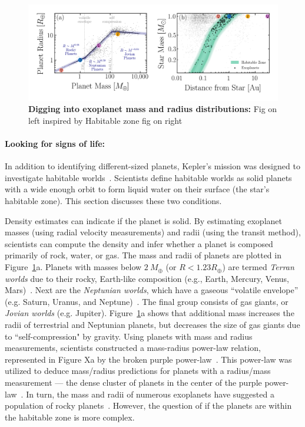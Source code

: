 \begin{figure}
\begin{center}
  \centerline{\includegraphics[width=1.1\linewidth]{src/figures/radii_and_mass_relations.png}}
  \caption{\textbf{Digging into exoplanet mass and radius distributions:} 
  Fig on left inspired by \cite{Chen:2017:ApJ}
  Habitable zone fig on right 
  }
  \label{fig:exo_mass_radius_relations}
\end{center}
\end{figure}



\paragraph{Looking for signs of life:}
In addition to identifying different-sized planets, Kepler's mission was designed to investigate habitable worlds~\cite{kepler_mission}.
Scientists define habitable worlds as solid planets with a wide enough orbit to form liquid water on their surface (the star's habitable zone).
This section discusses these two conditions.

Density estimates can indicate if the planet is solid.
By estimating exoplanet masses (using radial velocity measurements) and radii (using the transit method), scientists can compute the density and infer whether a planet is composed primarily of rock, water, or gas.
The mass and radii of planets are plotted in Figure~\ref{fig:exo_mass_radius_relations}a. 
Planets with masses below $2\ M_{\oplus}$ (or $R < 1.23 R_{\oplus}$) are termed \textit{Terran worlds} due to their rocky, Earth-like composition (e.g., Earth, Mercury, Venus, Mars)~\cite{}.
Next are the \textit{Neptunian worlds}, which have a gaseous ``volatile envelope'' (e.g. Saturn, Uranus, and Neptune)~\cite{Chen:2017:ApJ}.
The final group consists of gas giants, or \textit{Jovian worlds} (e.g. Jupiter).
Figure~\ref{fig:exo_mass_radius_relations}a shows that additional mass increases the radii of terrestrial and Neptunian planets, but decreases the size of gas giants due to ``self-compression" by gravity.
Using planets with mass and radius measurements, scientists constructed a mass-radius power-law relation, represented in Figure Xa by the broken purple power-law~\cite{Chen:2017:ApJ}.
This power-law was utilized to deduce mass/radius predictions for planets with a radius/mass measurement — the dense cluster of planets in the center of the purple power-law~\cite{Chen:2017:ApJ}.
In turn, the mass and radii of numerous exoplanets have suggested a population of rocky planets~\cite{kepler_mission}.
However, the question of if the planets are within the habitable zone is more complex.


